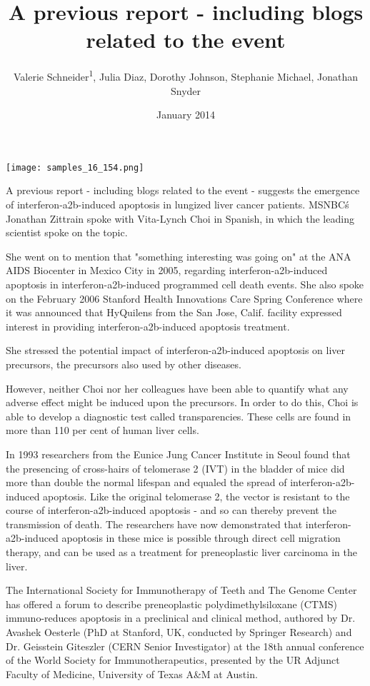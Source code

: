 \documentclass{article}
\title{A previous report - including blogs related to the event}
\author{Valerie Schneider\textsuperscript{1},  Julia Diaz,  Dorothy Johnson,  Stephanie Michael,  Jonathan Snyder}
\affil{\textsuperscript{1}First Affiliated Hospital of China Medical University}
\date{January 2014}
\begin{document}
\maketitle

\begin{center}
\begin{minipage}{0.75\linewidth}
\texttt{[image: samples\_16\_154.png]}
\end{minipage}
\end{center}

A previous report - including blogs related to the event - suggests the emergence of interferon-a2b-induced apoptosis in lungized liver cancer patients. MSNBC\'s Jonathan Zittrain spoke with Vita-Lynch Choi in Spanish, in which the leading scientist spoke on the topic.

She went on to mention that "something interesting was going on" at the ANA AIDS Biocenter in Mexico City in 2005, regarding interferon-a2b-induced apoptosis in interferon-a2b-induced programmed cell death events. She also spoke on the February 2006 Stanford Health Innovations Care Spring Conference where it was announced that HyQuilens from the San Jose, Calif. facility expressed interest in providing interferon-a2b-induced apoptosis treatment.

She stressed the potential impact of interferon-a2b-induced apoptosis on liver precursors, the precursors also used by other diseases.

However, neither Choi nor her colleagues have been able to quantify what any adverse effect might be induced upon the precursors. In order to do this, Choi is able to develop a diagnostic test called transparencies. These cells are found in more than 110 per cent of human liver cells.

In 1993 researchers from the Eunice Jung Cancer Institute in Seoul found that the presencing of cross-hairs of telomerase 2 (IVT) in the bladder of mice did more than double the normal lifespan and equaled the spread of interferon-a2b-induced apoptosis. Like the original telomerase 2, the vector is resistant to the course of interferon-a2b-induced apoptosis - and so can thereby prevent the transmission of death. The researchers have now demonstrated that interferon-a2b-induced apoptosis in these mice is possible through direct cell migration therapy, and can be used as a treatment for preneoplastic liver carcinoma in the liver.

The International Society for Immunotherapy of Teeth and The Genome Center has offered a forum to describe preneoplastic polydimethylsiloxane (CTMS) immuno-reduces apoptosis in a preclinical and clinical method, authored by Dr. Avashek Oesterle (PhD at Stanford, UK, conducted by Springer Research) and Dr. Geisstein Giteszler (CERN Senior Investigator) at the 18th annual conference of the World Society for Immunotherapeutics, presented by the UR Adjunct Faculty of Medicine, University of Texas A\&M at Austin.
\end{document}

